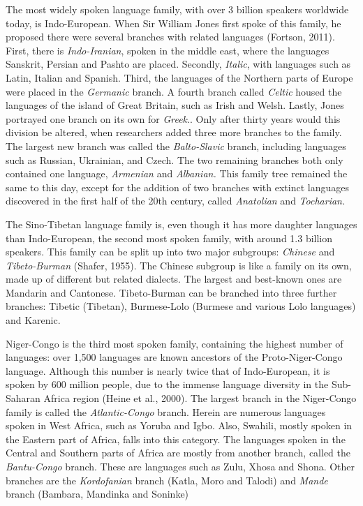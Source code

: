 The most widely spoken language family, with over 3 billion speakers worldwide today, is Indo-European. When Sir William Jones first spoke of this family, he proposed there were several branches with related languages (Fortson, 2011). First, there is \textit{Indo-Iranian}, spoken in the middle east, where the languages Sanskrit, Persian and Pashto are placed. Secondly, \textit{Italic}, with languages such as Latin, Italian and Spanish. Third, the languages of the Northern parts of Europe were placed in the \textit{Germanic} branch. A fourth branch called \textit{Celtic} housed the languages of the island of Great Britain, such as Irish and Welsh. Lastly, Jones portrayed one branch on its own for \textit{Greek}.. Only after thirty years would this division be altered, when researchers added three more branches to the family. The largest new branch was called the \textit{Balto-Slavic} branch, including languages such as Russian, Ukrainian, and Czech. The two remaining branches both only contained one language, \textit{Armenian} and \textit{Albanian.} This family tree remained the same to this day, except for the addition of two branches with extinct languages discovered in the first half of the 20th century, called \textit{Anatolian} and \textit{Tocharian.}  

The Sino-Tibetan language family is, even though it has more daughter languages than Indo-European, the second most spoken family, with around 1.3 billion speakers. This family can be split up into two major subgroups: \textit{Chinese} and \textit{Tibeto-Burman}  (Shafer, 1955). The Chinese subgroup is like a family on its own, made up of different but related dialects. The largest and best-known ones are Mandarin and Cantonese. Tibeto-Burman can be branched into three further branches: Tibetic (Tibetan), Burmese-Lolo (Burmese and various Lolo languages) and Karenic.  

Niger-Congo is the third most spoken family, containing the highest number of languages: over 1,500 languages are known ancestors of the Proto-Niger-Congo language. Although this number is nearly twice that of Indo-European, it is spoken by 600 million people, due to the immense language diversity in the Sub-Saharan Africa region (Heine et al., 2000). The largest branch in the Niger-Congo family is called the \textit{Atlantic-Congo} branch. Herein are numerous languages spoken in West Africa, such as Yoruba and Igbo. Also, Swahili, mostly spoken in the Eastern part of Africa, falls into this category. The languages spoken in the Central and Southern parts of Africa are mostly from another branch, called the \textit{Bantu-Congo} branch. These are languages such as Zulu, Xhosa and Shona. Other branches are the \textit{Kordofanian} branch (Katla, Moro and Talodi) and \textit{Mande} branch (Bambara, Mandinka and Soninke) 

